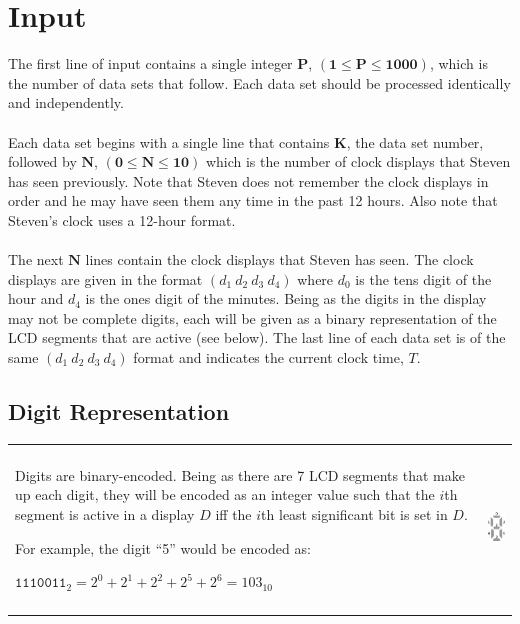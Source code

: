 \documentclass[a4paper,11pt,oneside]{article}
\begin{document}
\section{Input}
The first line of input contains a single integer $\boldsymbol{P}$,
$(\boldsymbol{1} \le \boldsymbol{P} \le \boldsymbol{1000})$, which is the
number of data sets that follow. Each data set should be processed identically
and independently.
\\\\
Each data set begins with a single line that contains $\boldsymbol{K}$, the data
set number, followed by $\boldsymbol{N}$,
$(\boldsymbol{0} \le \boldsymbol{N} \le \boldsymbol{10})$ which is the number
of clock displays that Steven has seen previously. Note that Steven does not
remember the clock displays in order and he may have seen them any time in the past
12 hours. Also note that Steven's clock uses a 12-hour format.
\\\\
The next $\boldsymbol{N}$ lines  contain the clock displays that Steven has seen.
The clock displays are given in the format $(d_1\ d_2\ d_3\ d_4)$ where $d_0$ is
the tens digit of the hour and $d_4$ is the ones digit of the minutes. Being as
the digits in the display may not be complete digits, each will be given as
a binary representation of the LCD segments that are active (see below). The last
line of each data set is of the same $(d_1\ d_2\ d_3\ d_4)$ format and indicates
the current clock time, $T$.

\subsection{Digit Representation}
\begin{tabularx}{\textwidth}{X r}
\parbox[m]{10cm}{Digits are binary-encoded. Being as there are 7 LCD segments that
make up each digit, they will be encoded as an integer value such that the $i$th segment
is active in a display $D$ iff the $i$th least significant bit is set in $D$.
\\\\
For example, the digit ``5'' would be encoded as:
\begin{center}
$\texttt{1110011}_2 = 2^0 + 2^1 + 2^2 + 2^5 + 2^6 = 103_{10}$
\end{center}
} & \parbox[m]{5cm}{\includegraphics[height=120pt]{./assets/digit_binary.eps}} \\
\end{tabularx}
\end{document}
